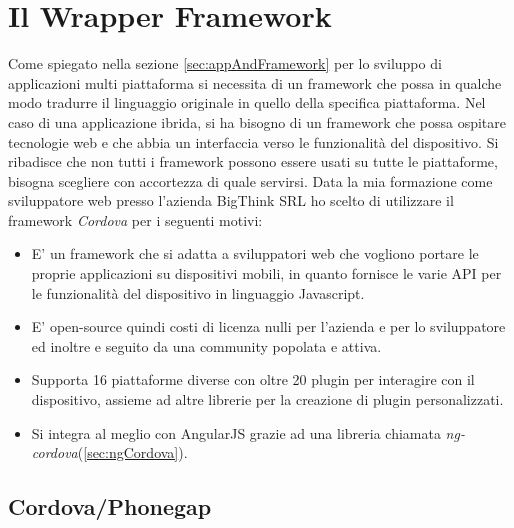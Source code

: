 \section{Il Wrapper Framework}
Come spiegato nella sezione \ref{sec:appAndFramework} per lo sviluppo di applicazioni multi piattaforma si necessita di un framework che possa in qualche modo tradurre il linguaggio originale in quello della specifica piattaforma.
Nel caso di una applicazione ibrida, si ha bisogno di un framework che possa ospitare tecnologie web e che abbia un interfaccia verso le funzionalità del dispositivo. Si ribadisce che non tutti i framework possono essere usati su tutte le piattaforme, bisogna scegliere con accortezza di quale servirsi.
Data la mia formazione come sviluppatore web presso l'azienda BigThink SRL ho scelto di utilizzare il framework \emph{Cordova} per i seguenti motivi:
\begin{itemize}
\item E' un framework che si adatta a sviluppatori web che vogliono portare le proprie applicazioni su dispositivi mobili, in quanto fornisce le varie API per le funzionalità del dispositivo in linguaggio Javascript.
\item E' open-source quindi costi di licenza nulli per l'azienda e per lo sviluppatore ed inoltre e seguito da una community popolata e attiva.
\item Supporta 16 piattaforme diverse con oltre 20 plugin per interagire con il dispositivo, assieme ad altre librerie per la creazione di plugin personalizzati.
\item Si integra al meglio con AngularJS grazie ad una libreria chiamata \emph{ng-cordova}(\ref{sec:ngCordova}).
\end{itemize}

\subsection{Cordova/Phonegap}


